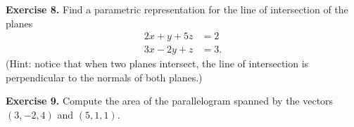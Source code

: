 \documentclass{article}
\begin{document}
\textbf{Exercise 8.} Find a parametric representation for the
line of intersection of the planes 
\begin{align*}
    2x + y + 5z &= 2\\
    3x - 2y + z &= 3.
\end{align*}
(Hint: notice that when two planes intersect, the line of intersection is perpendicular to
the normals of both planes.)

\textbf{Exercise 9.} Compute the area of the parallelogram spanned
by the vectors $(3,-2,4)$ and $(5,1,1)$.

\end{document}

